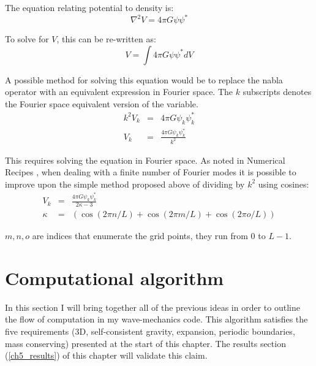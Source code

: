 The equation relating potential to density is:
\begin{equation}
 \nabla^2 V =  4\pi G \psi\psi^*
\end{equation}

\noindent To solve for $V$, this can be re-written as:
\begin{equation}
 V =  \int 4\pi G \psi\psi^* dV
\end{equation}

\noindent A possible method for solving this equation would be to replace the nabla operator with an equivalent expression in Fourier space. The $k$ subscripts denotes the Fourier space equivalent version of the variable.
\begin{eqnarray}
k^2 V_k &=&  4\pi G \psi_k \psi_k^* \nonumber \\
V_k &=&  \frac{4\pi G \psi_k \psi_k^*}{k^2}
\end{eqnarray}

\noindent This requires solving the equation in Fourier space. As noted in Numerical Recipes \citep{bib_nr}, when dealing with a finite number of Fourier modes it is possible to improve upon the simple method proposed above of dividing by $k^2$ using cosines:
\begin{eqnarray}
 V_k &=&  \frac{4\pi G \psi_k \psi_k^*}{ 2 \kappa - 3} \nonumber\\
 \kappa &=& (\cos(2 \pi n/L) + \cos(2 \pi m/L) + \cos(2 \pi o/L))
\end{eqnarray}

\noindent $m,n,o$ are indices that enumerate the grid points, they run from 0 to $L-1$.

\section{Computational algorithm}
In this section I will bring together all of the previous ideas in order to outline the flow of computation in my wave-mechanics code.
This algorithm satisfies the five requirements (3D, self-consistent gravity, expansion, periodic boundaries, mass conserving) presented at the start of this chapter. The results section (\ref{ch5_results}) of this chapter will validate this claim.

